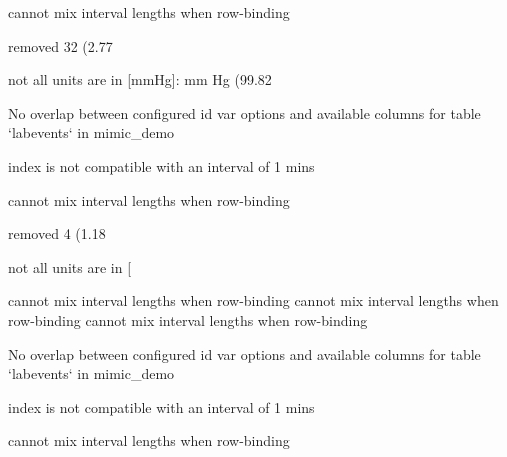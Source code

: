 \documentclass[
]{jss}
\begin{document}
\begin{CodeChunk}
\begin{CodeOutput}
cannot mix interval lengths when row-binding
\end{CodeOutput}

\begin{CodeOutput}
removed 32 (2.77%
\end{CodeOutput}

\begin{CodeOutput}
not all units are in [mmHg]: mm Hg (99.82%
\end{CodeOutput}

\begin{CodeOutput}
No overlap between configured id var options and available columns for table
`labevents` in mimic_demo
\end{CodeOutput}

\begin{CodeOutput}
index is not compatible with an interval of 1 mins
\end{CodeOutput}

\begin{CodeOutput}
cannot mix interval lengths when row-binding
\end{CodeOutput}

\begin{CodeOutput}
removed 4 (1.18%
\end{CodeOutput}

\begin{CodeOutput}
not all units are in [%
\end{CodeOutput}

\begin{CodeOutput}
cannot mix interval lengths when row-binding
cannot mix interval lengths when row-binding
cannot mix interval lengths when row-binding
\end{CodeOutput}

\begin{CodeOutput}
No overlap between configured id var options and available columns for table
`labevents` in mimic_demo
\end{CodeOutput}

\begin{CodeOutput}
index is not compatible with an interval of 1 mins
\end{CodeOutput}

\begin{CodeOutput}
cannot mix interval lengths when row-binding
\end{CodeOutput}


\end{CodeChunk}
\end{document}
